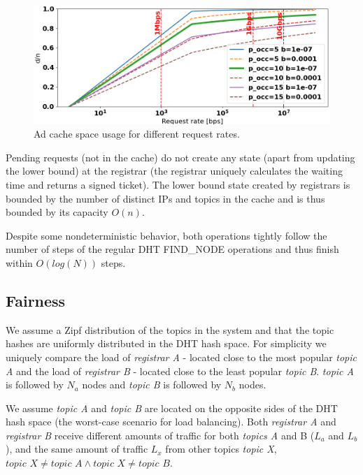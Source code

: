 \begin{figure}[t]
    \includegraphics[width=1\linewidth]{img/cache_size_limit}
    \vspace{-0.10in}
    \caption{Ad cache space usage for different request rates.
    }
    \label{fig:cache_size_limit}
    \vspace{-0.15in}
\end{figure}
Pending requests (\ie not in the cache) do not create any state (apart from updating the lower bound) at the registrar (\ie the registrar uniquely calculates the waiting time and returns a signed ticket). The lower bound state created by registrars is bounded by the number of distinct IPs and topics in the cache and is thus bounded by its capacity $O(n)$.

Despite some nondeterministic behavior, both operations tightly follow the number of steps of the regular DHT FIND\_NODE operations and thus finish within $O(log(N))$ steps.

\subsection{Fairness}
We assume a Zipf distribution of the topics  in the system and that the topic hashes are uniformly distributed in the DHT hash space. For simplicity we uniquely compare the load of \emph{registrar A} - located close to the most popular \emph{topic A} and the load of \emph{registrar B} - located close to the least popular \emph{topic B}. \emph{topic A} is followed by $N_a$ nodes and \emph{topic B} is followed by $N_b$ nodes. 

We assume \emph{topic A} and \emph{topic B} are located on the opposite sides of the DHT hash space (the worst-case scenario for load balancing). Both \emph{registrar A} and \emph{registrar B} receive different amounts of traffic for both \emph{topics A} and {B} ($L_a$ and $L_b$), and the same amount of traffic $L_x$ from other topics \emph{topic X}, $\textit{topic X} \neq \textit{topic A} \land  \textit{topic X} \neq \textit{topic B}$. 

